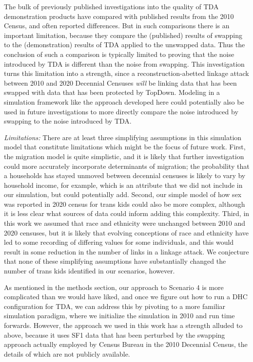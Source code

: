 \documentclass{jpc} %
\theoremstyle{plain}\newtheorem{satz}[thm]{Satz} %
\begin{document}
The bulk of previously published investigations into the quality of TDA demonstration products have compared with published results from the 2010 Census, and often reported differences.  But in such comparisons there is an important limitation, because they compare the (published) results of swapping to the (demonstration) results of TDA applied to the unswapped data.  Thus the conclusion of such a comparison is typically limited to proving that the noise introduced by TDA is different than the noise from swapping.
This investigation turns this limitation into a strength, since a reconstruction-abetted linkage attack between 2010 and 2020 Decennial Censuses \emph{will} be linking data that has been swapped with data that has been protected by TopDown.
Modeling in a simulation framework like the approach developed here could potentially also be used in future investigations to more directly compare the noise introduced by swapping to the noise introduced by TDA.

\emph{Limitations:}
There are at least three simplifying assumptions in this simulation model that constitute limitations which might be the focus of future work.  First, the migration model is quite simplistic, and it is likely that further investigation could more accurately incorporate determinants of migration; the probability that a households has stayed unmoved between decennial censuses is likely to vary by household income, for example, which is an attribute that we did not include in our simulation, but could potentially add.
Second, our simple model of how sex was reported in 2020 census for trans kids could also be more complex, although it is less clear what sources of data could inform adding this complexity. Third, in this work we assumed that race and ethnicity were unchanged between 2010 and 2020 censuses, but it is likely that evolving conceptions of race and ethnicity have led to some recording of differing values for some individuals, and this would result in some reduction in the number of links in a linkage attack.  We conjecture that none of these simplifying assumptions have substantially changed the number of trans kids identified in our scenarios, however.

As mentioned in the methods section, our approach to Scenario 4 is more complicated than we would have liked, and once we figure out how to run a DHC configuration for TDA, we can address this by pivoting to a more familiar simulation paradigm, where we initialize the simulation in 2010 and run time forwards.  However, the approach we used in this work has a strength alluded to above, because it uses SF1 data that has been perturbed by the swapping approach actually employed by Census Bureau in the 2010 Decennial Census, the details of which are not publicly available.
\end{document}

